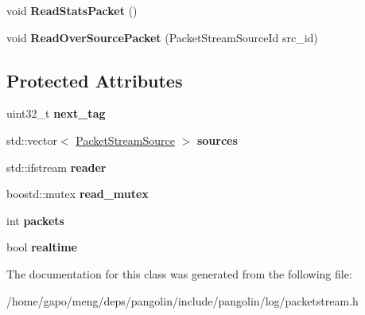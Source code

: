 \begin{DoxyCompactItemize}
\item 
void {\bfseries Read\+Stats\+Packet} ()\hypertarget{classpangolin_1_1_packet_stream_reader_ad0a465df200d79caba45efc373f30d34}{}\label{classpangolin_1_1_packet_stream_reader_ad0a465df200d79caba45efc373f30d34}

\item 
void {\bfseries Read\+Over\+Source\+Packet} (Packet\+Stream\+Source\+Id src\+\_\+id)\hypertarget{classpangolin_1_1_packet_stream_reader_af5ac5ea1d39fdf07529d474c065b350b}{}\label{classpangolin_1_1_packet_stream_reader_af5ac5ea1d39fdf07529d474c065b350b}

\end{DoxyCompactItemize}
\subsection*{Protected Attributes}
\begin{DoxyCompactItemize}
\item 
uint32\+\_\+t {\bfseries next\+\_\+tag}\hypertarget{classpangolin_1_1_packet_stream_reader_a7239d69f9b43fac490395bcbce28c134}{}\label{classpangolin_1_1_packet_stream_reader_a7239d69f9b43fac490395bcbce28c134}

\item 
std\+::vector$<$ \hyperlink{structpangolin_1_1_packet_stream_source}{Packet\+Stream\+Source} $>$ {\bfseries sources}\hypertarget{classpangolin_1_1_packet_stream_reader_ae3898701de5378a9915e4227ffca0378}{}\label{classpangolin_1_1_packet_stream_reader_ae3898701de5378a9915e4227ffca0378}

\item 
std\+::ifstream {\bfseries reader}\hypertarget{classpangolin_1_1_packet_stream_reader_a0972aad6e76f5b2ff52da1cedb9fc652}{}\label{classpangolin_1_1_packet_stream_reader_a0972aad6e76f5b2ff52da1cedb9fc652}

\item 
boostd\+::mutex {\bfseries read\+\_\+mutex}\hypertarget{classpangolin_1_1_packet_stream_reader_aef1a3ce851522a0778a5af396dd150ce}{}\label{classpangolin_1_1_packet_stream_reader_aef1a3ce851522a0778a5af396dd150ce}

\item 
int {\bfseries packets}\hypertarget{classpangolin_1_1_packet_stream_reader_acbb565d521eaf0fe3165b747c85c478f}{}\label{classpangolin_1_1_packet_stream_reader_acbb565d521eaf0fe3165b747c85c478f}

\item 
bool {\bfseries realtime}\hypertarget{classpangolin_1_1_packet_stream_reader_a13dbb3164ace61d512eeb7a3980624c3}{}\label{classpangolin_1_1_packet_stream_reader_a13dbb3164ace61d512eeb7a3980624c3}

\end{DoxyCompactItemize}


The documentation for this class was generated from the following file\+:\begin{DoxyCompactItemize}
\item 
/home/gapo/meng/deps/pangolin/include/pangolin/log/packetstream.\+h\end{DoxyCompactItemize}

